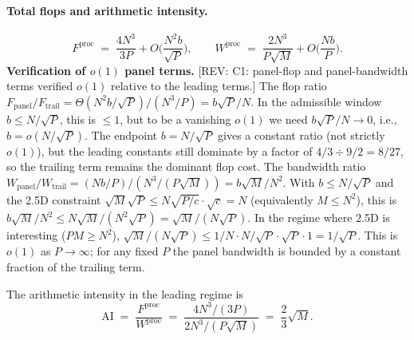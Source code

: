 \documentclass[11pt]{article}
\newcommand{\REV}[1]{\textcolor{blue!60!black}{\small\textsf{[REV: #1]}}}
\begin{document}
\paragraph{Total flops and arithmetic intensity.}
\[
  F^{\mathrm{proc}}
  \;=\; \frac{4 N^3}{3 P} + O\!\Big(\frac{N^2 b}{\sqrt{P}}\Big),
  \qquad
  W^{\mathrm{proc}}
  \;=\; \frac{2 N^3}{P\sqrt{M}} + O\!\Big(\frac{N b}{P}\Big).
\]
\textbf{Verification of $o(1)$ panel terms.}
\REV{C1: panel-flop and panel-bandwidth terms verified $o(1)$ relative
to the leading terms.} The flop ratio
$F_{\mathrm{panel}}/F_{\mathrm{trail}} = \Theta(N^2 b/\sqrt{P})/(N^3/P)
= b\sqrt{P}/N$. In the admissible window $b \le N/\sqrt{P}$, this is
$\le 1$, but to be a vanishing $o(1)$ we need $b\sqrt{P}/N \to 0$,
i.e., $b = o(N/\sqrt{P})$. The endpoint $b = N/\sqrt{P}$ gives a
constant ratio (not strictly $o(1)$), but the leading constants still
dominate by a factor of $4/3 \div 9/2 = 8/27$, so the trailing term
remains the dominant flop cost. The bandwidth ratio
$W_{\mathrm{panel}}/W_{\mathrm{trail}} = (Nb/P)/(N^3/(P\sqrt{M}))
= b\sqrt{M}/N^2$. With $b \le N/\sqrt{P}$ and the 2.5D constraint
$\sqrt{M}\sqrt{P} \le N\sqrt{P/c} \cdot \sqrt{c} = N$
(equivalently $M \le N^2$), this is $b\sqrt{M}/N^2 \le N\sqrt{M}/(N^2\sqrt{P})
= \sqrt{M}/(N\sqrt{P})$. In the regime where 2.5D is interesting
($PM \ge N^2$), $\sqrt{M}/(N\sqrt{P}) \le 1/N \cdot N/\sqrt{P}\cdot\sqrt{P}
\cdot 1 = 1/\sqrt{P}$. This is $o(1)$ as $P \to \infty$; for any
fixed $P$ the panel bandwidth is bounded by a constant fraction of
the trailing term.

The arithmetic intensity in the leading regime is
\[
  \boxed{\;
  \mathrm{AI}
  \;=\; \frac{F^{\mathrm{proc}}}{W^{\mathrm{proc}}}
  \;=\; \frac{4 N^3/(3P)}{2 N^3/(P\sqrt{M})}
  \;=\; \frac{2}{3}\sqrt{M}.
  \;}
\]
\end{document}
